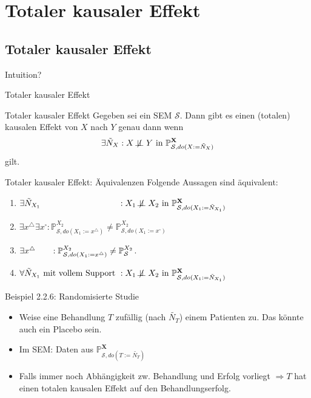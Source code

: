 \section{Totaler kausaler Effekt}
\subsection{Totaler kausaler Effekt}
\begin{frame}{}{}
    {\Large Intuition?}
\end{frame}

\begin{frame}{Totaler kausaler Effekt}
    \begin{block}{Totaler kausaler Effekt}
        Gegeben sei ein SEM $\mathcal{S}$. Dann gibt es einen
        (totalen) kausalen Effekt von $X$ nach $Y$ genau dann wenn
        \[\exists \tilde{N}_X : X \not\!\perp\!\!\!\perp Y \text{ in } \mathbb{P}_{\mathcal{S}, do(X:=\tilde{N}_X)}^{\mathbf{X}}\]
        gilt.
    \end{block}
\end{frame}

\begin{frame}[t]{Totaler kausaler Effekt: Äquivalenzen}
    Folgende Aussagen sind äquivalent:

    \begin{enumerate}[label=(\roman*)]
        \item $\exists \tilde{N}_{X_1} \hphantom{\text{ mit vollem Support }}: X_1 \not\!\perp\!\!\!\perp X_2 \text{ in } \mathbb{P}_{\mathcal{S}, do(X_1:=\tilde{N}_{X_1})}^{\mathbf{X}}$
        \item $\exists x^\triangle \exists x^\square: \mathbb{P}_{\mathcal{S}, do(X_1:=x^\triangle)}^{X_2} \neq \mathbb{P}_{\mathcal{S}, do(X_1:=x^\square)}^{X_2}$
        \item $\exists x^\triangle \hphantom{\exists x^\square}: \mathbb{P}_{\mathcal{S}, do(X_1:=x^\triangle)}^{X_2} \neq \mathbb{P}_\mathcal{S}^{X_2}$.
        \item $\forall \tilde{N}_{X_1} \text{ mit vollem Support }: X_1 \not\!\perp\!\!\!\perp X_2 \text{ in } \mathbb{P}_{\mathcal{S}, do(X_1:=\tilde{N}_{X_1})}^{\mathbf{X}}$
    \end{enumerate}
\end{frame}

\begin{frame}{Beispiel 2.2.6: Randomisierte Studie}
    \begin{itemize}
        \item<1-> Weise eine Behandlung $T$ zufällig (nach $\tilde{N_T}$) einem
              Patienten zu. Das könnte auch ein Placebo sein.
        \item<2-> Im SEM: Daten aus $\mathbb{P}_{\mathcal{S}, do(T:=\tilde{N_T})}^{\mathbf{X}}$
        \item<3-> Falls immer noch Abhängigkeit zw. Behandlung und Erfolg
              vorliegt $\Rightarrow T$ hat einen totalen kausalen Effekt auf
              den Behandlungserfolg.
    \end{itemize}
\end{frame}

